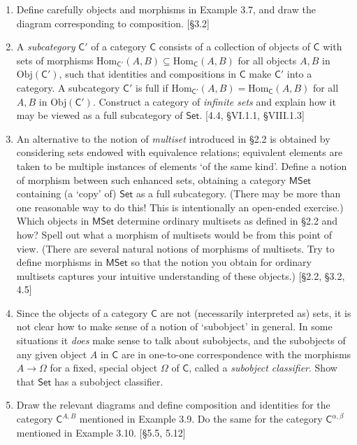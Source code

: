 \begin{enumerate}
    \item Define carefully objects and morphisms in Example 3.7, and draw the diagram corresponding to composition. [\S3.2]

    \item A \textit{subcategory} $\mathsf{C}'$ of a category $\mathsf{C}$ consists of a collection of objects of $\mathsf{C}$ with sets of morphisms $\mathrm{Hom}_{\mathsf{C}'}(A, B) \subseteq \mathrm{Hom}_{\mathsf{C}}(A, B)$ for all objects $A, B$ in $\mathrm{Obj}(\mathsf{C}')$, such that identities and compositions in $\mathsf{C}$ make $\mathsf{C}'$ into a category. A subcategory $\mathsf{C}'$ is full if $\mathrm{Hom}_{\mathsf{C}'}(A, B) = \mathrm{Hom}_{\mathsf{C}}(A, B)$ for all $A, B$ in $\mathrm{Obj}(\mathsf{C}')$. Construct a category of \textit{infinite sets} and explain how it may be viewed as a full subcategory of $\mathsf{Set}$. [4.4, \S VI.1.1, \S VIII.1.3]

    \item An alternative to the notion of \textit{multiset} introduced in \S2.2 is obtained by considering sets endowed with equivalence relations; equivalent elements are taken to be multiple instances of elements `of the same kind'. Define a notion of morphism between such enhanced sets, obtaining a category $\mathsf{MSet}$ containing (a `copy' of) $\mathsf{Set}$ as a full subcategory. (There may be more than one reasonable way to do this! This is intentionally an open-ended exercise.) Which objects in $\mathsf{MSet}$ determine ordinary multisets as defined in \S2.2 and how? Spell out what a morphism of multisets would be from this point of view. (There are several natural notions of morphisms of multisets. Try to define morphisms in $\mathsf{MSet}$ so that the notion you obtain for ordinary multisets captures your intuitive understanding of these objects.) [\S2.2, \S3.2, 4.5]

    \item Since the objects of a category $\mathsf{C}$ are not (necessarily interpreted as) sets, it is not clear how to make sense of a notion of `subobject' in general. In some situations it \textit{does} make sense to talk about subobjects, and the subobjects of any given object $A$ in $\mathsf{C}$ are in one-to-one correspondence with the morphisms $A \to \Omega$ for a fixed, special object $\Omega$ of $\mathsf{C}$, called a \textit{subobject classifier}. Show that $\mathsf{Set}$ has a subobject classifier.

    \item Draw the relevant diagrams and define composition and identities for the category $\mathsf{C}^{A,B}$ mentioned in Example 3.9. Do the same for the category $\mathsf{C}^{\alpha,\beta}$ mentioned in Example 3.10. [\S5.5, 5.12]
\end{enumerate}
